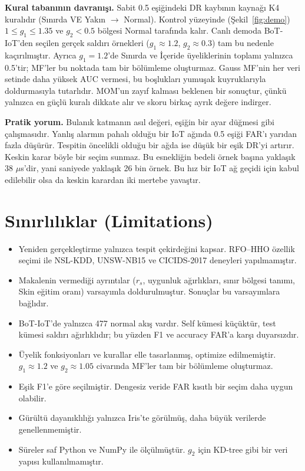 \documentclass[11pt,a4paper]{article}
\newcommand{\gbir}{g_1}
\newcommand{\giki}{g_2}
\begin{document}
\textbf{Kural tabanının davranışı.} Sabit 0.5 eşiğindeki DR kaybının kaynağı K4 kuralıdır (Sınırda VE Yakın $\to$ Normal). Kontrol yüzeyinde (Şekil~\ref{fig:demo}) $1\le\gbir\le1.35$ ve $\giki<0.5$ bölgesi Normal tarafında kalır. Canlı demoda BoT-IoT'den seçilen gerçek saldırı örnekleri ($\gbir\approx1.2$, $\giki\approx0.3$) tam bu nedenle kaçırılmıştır. Ayrıca $\gbir=1.2$'de Sınırda ve İçeride üyeliklerinin toplamı yalnızca 0.5'tir; MF'ler bu noktada tam bir bölümleme oluşturmaz. Gauss MF'nin her veri setinde daha yüksek AUC vermesi, bu boşlukları yumuşak kuyruklarıyla doldurmasıyla tutarlıdır. MOM'un zayıf kalması beklenen bir sonuçtur, çünkü yalnızca en güçlü kuralı dikkate alır ve skoru birkaç ayrık değere indirger.

\textbf{Pratik yorum.} Bulanık katmanın asıl değeri, eşiğin bir ayar düğmesi gibi çalışmasıdır. Yanlış alarmın pahalı olduğu bir IoT ağında 0.5 eşiği FAR'ı yarıdan fazla düşürür. Tespitin öncelikli olduğu bir ağda ise düşük bir eşik DR'yi artırır. Keskin karar böyle bir seçim sunmaz. Bu esnekliğin bedeli örnek başına yaklaşık 38 $\mu$s'dir, yani saniyede yaklaşık 26 bin örnek. Bu hız bir IoT ağ geçidi için kabul edilebilir olsa da keskin karardan iki mertebe yavaştır.

\section{Sınırlılıklar (Limitations)}
\begin{itemize}
  \item Yeniden gerçekleştirme yalnızca tespit çekirdeğini kapsar. RFO--HHO özellik seçimi ile NSL-KDD, UNSW-NB15 ve CICIDS-2017 deneyleri yapılmamıştır.
  \item Makalenin vermediği ayrıntılar ($r_s$, uygunluk ağırlıkları, sınır bölgesi tanımı, Skin eğitim oranı) varsayımla doldurulmuştur. Sonuçlar bu varsayımlara bağlıdır.
  \item BoT-IoT'de yalnızca 477 normal akış vardır. Self kümesi küçüktür, test kümesi saldırı ağırlıklıdır; bu yüzden F1 ve accuracy FAR'a karşı duyarsızdır.
  \item Üyelik fonksiyonları ve kurallar elle tasarlanmış, optimize edilmemiştir. $\gbir\approx1.2$ ve $\giki\approx1.05$ civarında MF'ler tam bir bölümleme oluşturmaz.
  \item Eşik F1'e göre seçilmiştir. Dengesiz veride FAR kısıtlı bir seçim daha uygun olabilir.
  \item Gürültü dayanıklılığı yalnızca Iris'te görülmüş, daha büyük verilerde genellenmemiştir.
  \item Süreler saf Python ve NumPy ile ölçülmüştür. $\giki$ için KD-tree gibi bir veri yapısı kullanılmamıştır.
\end{itemize}
\end{document}
